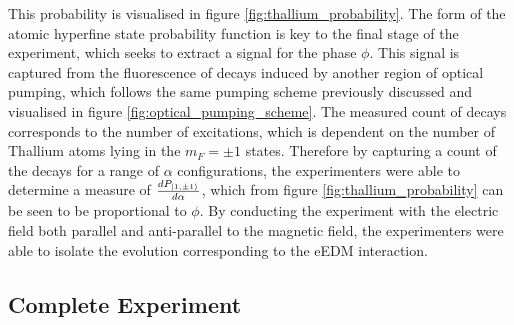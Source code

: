 This probability is visualised in figure \ref{fig:thallium_probability}. The form of the atomic hyperfine state probability function is key to the final stage of the experiment, which seeks to extract a signal for the phase $\phi$. This signal is captured from the fluorescence of decays induced by another region of optical pumping, which follows the same pumping scheme previously discussed and visualised in figure \ref{fig:optical_pumping_scheme}. The measured count of decays corresponds to the number of excitations, which is dependent on the number of Thallium atoms lying in the $m_F = \pm 1$ states. Therefore by capturing a count of the decays for a range of $\alpha$ configurations, the experimenters were able to determine a measure of $\frac{d P_{\ket{1, \pm 1}}}{d\alpha}$, which from figure \ref{fig:thallium_probability} can be seen to be proportional to $\phi$. By conducting the experiment with the electric field both parallel and anti-parallel to the magnetic field, the experimenters were able to isolate the evolution corresponding to the eEDM interaction.

\subsection{Complete Experiment}

